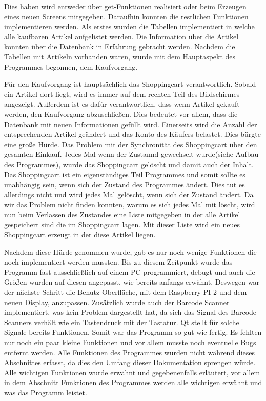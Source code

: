 \documentclass[11pt,a4paper]{article} %
\begin{document}
Dies haben wird entweder über get-Funktionen realisiert oder beim Erzeugen eines neuen Screens mitgegeben.
Daraufhin konnten die restlichen Funktionen implementieren werden.
Als erstes wurden die Tabellen implementiert in welche alle kaufbaren Artikel aufgelistet werden.
Die Information über die Artikel konnten über die Datenbank in Erfahrung gebracht werden.
Nachdem die Tabellen mit Artikeln vorhanden waren, wurde mit dem Hauptaspekt des Programmes begonnen, dem Kaufvorgang.
\par
Für den Kaufvorgang ist hauptsächlich das Shoppingcart verantwortlich. Sobald ein Artikel dort liegt, wird es immer auf dem rechten Teil des Bildschirmes angezeigt.
Außerdem ist es dafür verantwortlich, dass wenn Artikel gekauft werden, den Kaufvorgang abzuschließen.
Dies bedeutet vor allem, dass die Datenbank mit neuen Informationen gefüllt wird. Einerseits wird die Anzahl der entsprechenden Artikel geändert und das Konto des Käufers belastet.
Dies bürgte eine große Hürde. Das Problem mit der Synchronität des Shoppingcart über den gesamten Einkauf.
Jedes Mal wenn der Zustannd gewechselt wurde(siehe Aufbau des Programmes), wurde das Shoppingcart gelöscht und damit auch der Inhalt.
Das Shoppingcart ist ein eigenständiges Teil Programmes und somit sollte es unabhängig sein, wenn sich der Zustand des Programmes ändert.
Dies tut es allerdings nicht und wird jedes Mal gelöscht, wenn sich der Zustand ändert.
Da wir das Problem nicht finden konnten, warum es sich jedes Mal mit löscht, wird nun beim Verlassen des Zustandes eine Liste mitgegeben in der alle Artikel gespeichert sind die im Shoppingcart lagen.
Mit dieser Liste wird ein neues Shoppingcart erzeugt in der diese Artikel liegen.
\par
Nachdem diese Hürde genommen wurde, gab es nur noch wenige Funktionen die noch implementiert werden mussten.
Bis zu diesem Zeitpunkt wurde das Programm fast ausschließlich auf einem PC programmiert, debugt und auch die Größen wurden auf diesen angepasst, wie bereits anfangs erwähnt.
Deswegen war der nächste Schritt die Benutz Oberfläche, mit dem Raspberry PI 2 und dem neuen Display, anzupassen.
Zusätzlich wurde auch der Barcode Scanner implementiert, was kein Problem dargestellt hat, da sich das Signal des Barcode Scanners verhält wie ein Tastendruck mit der Tastatur. Qt stellt für solche Signale bereits Funktionen.
Somit war das Programm so gut wie fertig. Es fehlten nur noch ein paar kleine Funktionen und vor allem musste noch eventuelle Bugs entfernt werden.
Alle Funktionen des Programmes wurden nicht während dieses Abschnittes erfasst, da dies den Umfang dieser Dokumentation sprengen würde.
Alle wichtigen Funktionen wurde erwähnt und gegebenenfalls erläutert, vor allem in dem Abschnitt Funktionen des Programmes werden alle wichtigen erwähnt und was das Programm leistet.
\end{document}
